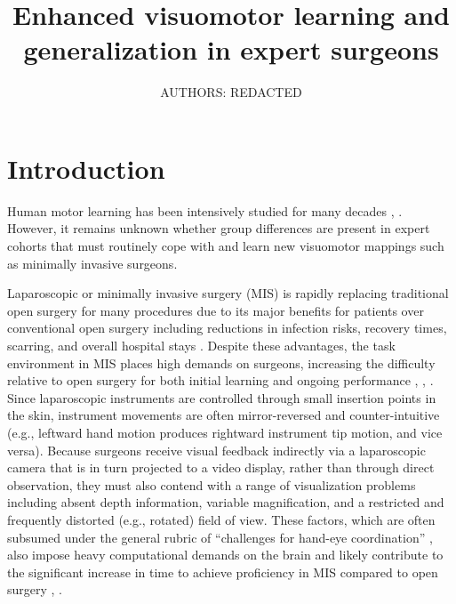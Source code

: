 \documentclass[jou, 11pt, longtable, floatsintext, notab]{apa6}
\title{\textbf{Enhanced visuomotor learning and
    generalization in expert surgeons}}
\author{AUTHORS: REDACTED}
\affiliation{AFFILIATIONS: REDACTED}
\begin{document}
\maketitle

\section{Introduction}
Human motor learning has been intensively studied for many
decades \cite{shadmehr_error_2010},
\cite{krakauer_human_2011}. However, it remains unknown
whether group differences are present in expert cohorts that
must routinely cope with and learn new visuomotor mappings
such as minimally invasive surgeons.

Laparoscopic or minimally invasive surgery (MIS) is rapidly
replacing traditional open surgery for many procedures due
to its major benefits for patients over conventional open
surgery including reductions in infection risks, recovery
times, scarring, and overall hospital stays
\cite{cuschieri_whither_1995}. Despite these advantages, the
task environment in MIS places high demands on surgeons,
increasing the difficulty relative to open surgery for both
initial learning \cite{braga_laparoscopic_2002} and ongoing
performance \cite{cuschieri_whither_1995},
\cite{den_boer_problems_2001}, \cite{joice_ergonomic_1998}.
Since laparoscopic instruments are controlled through small
insertion points in the skin, instrument movements are often
mirror-reversed and counter-intuitive (e.g., leftward hand
motion produces rightward instrument tip motion, and vice
versa). Because surgeons receive visual feedback indirectly
via a laparoscopic camera that is in turn projected to a
video display, rather than through direct observation, they
must also contend with a range of visualization problems
including absent depth information, variable magnification,
and a restricted and frequently distorted (e.g., rotated)
field of view. These factors, which are often subsumed under
the general rubric of ``challenges for hand-eye
coordination'' \cite{wentink_eye-hand_2001}, also impose
heavy computational demands on the brain and likely
contribute to the significant increase in time to achieve
proficiency in MIS compared to open surgery
\cite{rattner_beyond_1999}, \cite{schauer_learning_2003}.
\end{document}
